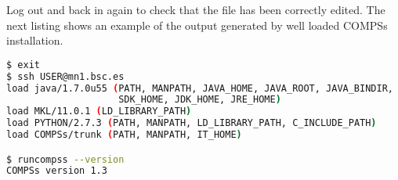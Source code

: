Log out and back in again to check that the file has been correctly edited. The next listing shows an example of the
output generated by well loaded COMPSs installation. 
\begin{lstlisting}[language=bash]
$ exit
$ ssh USER@mn1.bsc.es
load java/1.7.0u55 (PATH, MANPATH, JAVA_HOME, JAVA_ROOT, JAVA_BINDIR, 
                    SDK_HOME, JDK_HOME, JRE_HOME)
load MKL/11.0.1 (LD_LIBRARY_PATH)
load PYTHON/2.7.3 (PATH, MANPATH, LD_LIBRARY_PATH, C_INCLUDE_PATH)
load COMPSs/trunk (PATH, MANPATH, IT_HOME)

$ runcompss --version
COMPSs version 1.3
\end{lstlisting}


